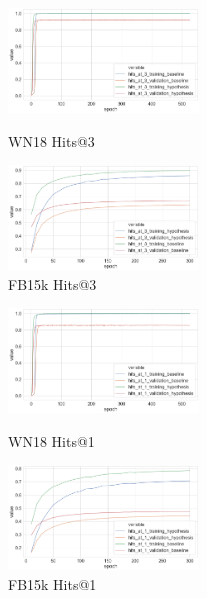 
\begin{figure}[H]
	\parbox{.5\linewidth}{
   		\centering
    		\includegraphics[width=0.45\textwidth, height=0.2\textheight]{WN18_hits_at_3_Results}
		\caption{WN18 Hits@3}
		}
	\hfill
	\parbox{.5\linewidth}{
   		\centering
		\includegraphics[width=0.45\textwidth, height=0.2\textheight]{FB15k_hits_at_3_Results}
		\caption{FB15k Hits@3}
		}
\end{figure}


\begin{figure}[H]
	\parbox{.5\linewidth}{
   		\centering
    		\includegraphics[width=0.45\textwidth, height=0.2\textheight]{WN18_hits_at_1_Results}
		\caption{WN18 Hits@1}
		}
	\hfill
	\parbox{.5\linewidth}{
   		\centering
		\includegraphics[width=0.45\textwidth, height=0.2\textheight]{FB15k_hits_at_1_Results}
		\caption{FB15k Hits@1}
		}
\end{figure}

